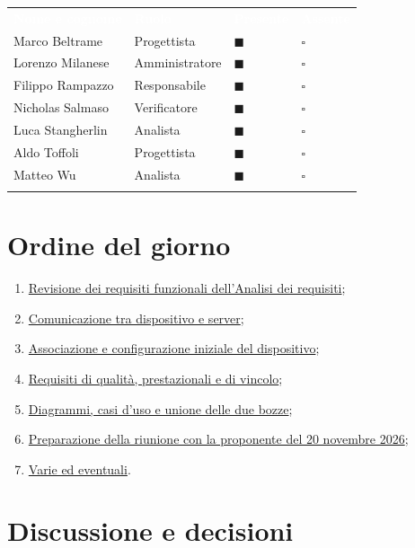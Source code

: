 \documentclass[12pt,a4paper]{article}
\newcommand{\vnum}{9}                     %
\newcommand{\thc}[1]{\textcolor{white}{\textbf{#1}}}              %
\newcommand{\rl}{\arrayrulecolor{bfline}\hline}                   %
\newcommand{\presente}{$\blacksquare$ & $\square$}                %
\newcommand{\assente}{$\square$ & $\blacksquare$}
\newcommand{\tightlist}{\setlength{\itemsep}{1pt}\setlength{\parskip}{0pt}}
\begin{document}
\begin{center}
\begin{tabularx}{\linewidth}{>{\raggedright\arraybackslash}X>{\centering\arraybackslash}X>{\centering\arraybackslash}p{2.2cm}>{\centering\arraybackslash}p{2.2cm}}
\rowcolor{bfblue}\thc{Nome e cognome} & \thc{Ruolo} & \thc{Presente} & \thc{Assente} \\
Marco Beltrame & Progettista & \presente \\ \rl
Lorenzo Milanese & Amministratore & \presente \\ \rl
Filippo Rampazzo & Responsabile & \presente \\ \rl
Nicholas Salmaso & Verificatore & \presente \\ \rl
Luca Stangherlin & Analista & \presente \\ \rl
Aldo Toffoli & Progettista & \presente \\ \rl
Matteo Wu & Analista & \presente \\ \rl
\end{tabularx}
\end{center}

\hypertarget{ordine-del-giorno}{%
\section{Ordine del giorno}}

\begin{enumerate}
\tightlist
\item \hyperlink{odg-1}{Revisione dei requisiti funzionali dell'Analisi dei requisiti};
\item \hyperlink{odg-2}{Comunicazione tra dispositivo e server};
\item \hyperlink{odg-3}{Associazione e configurazione iniziale del dispositivo};
\item \hyperlink{odg-4}{Requisiti di qualità, prestazionali e di vincolo};
\item \hyperlink{odg-5}{Diagrammi, casi d'uso e unione delle due bozze};
\item \hyperlink{odg-6}{Preparazione della riunione con la proponente del 20 novembre 2026};
\item \hyperlink{varie-ed-eventuali}{Varie ed eventuali}.
\end{enumerate}
\newpage

\hypertarget{discussione-e-decisioni}{%
\section{Discussione e decisioni}}
\end{document}
